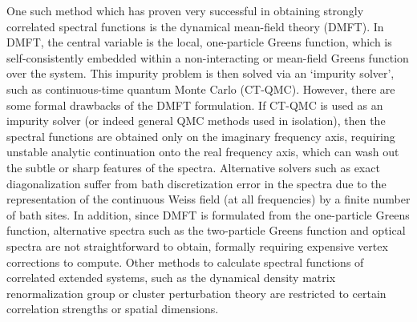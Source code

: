 \documentclass[aps,showpacs,twocolumn,nobibnotes]{revtex4}
\begin{document}
One such method which has proven very successful in obtaining strongly correlated spectral functions is the dynamical mean-field theory (DMFT). In DMFT, the central variable is the
local, one-particle Greens function, which is self-consistently embedded within a non-interacting or mean-field Greens function over the system. This impurity problem is then solved via
an `impurity solver', such as continuous-time quantum Monte Carlo (CT-QMC). However, there are some formal drawbacks of the DMFT formulation. If CT-QMC is used as an 
impurity solver (or indeed general QMC methods used in isolation), then the spectral functions are obtained only on the imaginary frequency axis, requiring unstable analytic continuation onto 
the real frequency axis, which can wash out the subtle or sharp features of the spectra\cite{Thomas2011}. Alternative solvers such as exact diagonalization
suffer from bath discretization error in the spectra due to the representation of the continuous Weiss field (at all frequencies) by a finite number of bath sites. In addition, since DMFT
is formulated from the one-particle Greens function, alternative spectra such as the two-particle Greens function and optical spectra are not straightforward to obtain, formally 
requiring expensive vertex corrections to compute\cite{Millis2012}. Other methods to calculate spectral functions of correlated extended systems, such as the dynamical density 
matrix renormalization group\cite{Jeckelmann2004} or cluster perturbation theory\cite{Senechal2000} are restricted to certain correlation strengths or spatial dimensions.
\end{document}
